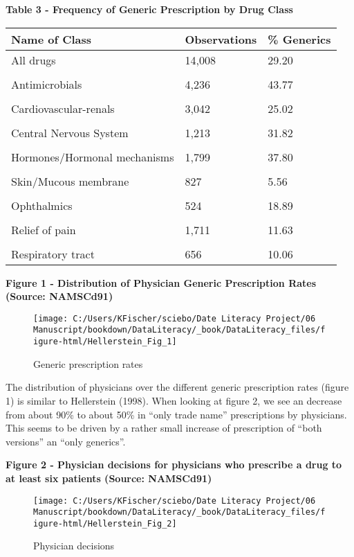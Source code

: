 \documentclass[
]{book}
\begin{document}
\textbf{Table 3 - Frequency of Generic Prescription by Drug Class}

\begin{longtable}[]{@{}lll@{}}
\toprule
Name of Class & Observations & \% Generics\tabularnewline
\midrule
\endhead
All drugs & 14,008 & 29.20\tabularnewline
& &\tabularnewline
Antimicrobials & 4,236 & 43.77\tabularnewline
& &\tabularnewline
Cardiovascular-renals & 3,042 & 25.02\tabularnewline
& &\tabularnewline
Central Nervous System & 1,213 & 31.82\tabularnewline
& &\tabularnewline
Hormones/Hormonal mechanisms & 1,799 & 37.80\tabularnewline
& &\tabularnewline
Skin/Mucous membrane & 827 & 5.56\tabularnewline
& &\tabularnewline
Ophthalmics & 524 & 18.89\tabularnewline
& &\tabularnewline
Relief of pain & 1,711 & 11.63\tabularnewline
& &\tabularnewline
Respiratory tract & 656 & 10.06\tabularnewline
\bottomrule
\end{longtable}

\textbf{Figure 1 - Distribution of Physician Generic Prescription Rates
(Source: NAMSCd91)}

\begin{figure}

{\centering \texttt{[image: C:/Users/KFischer/sciebo/Date Literacy Project/06 Manuscript/bookdown/DataLiteracy/\_book/DataLiteracy\_files/figure-html/Hellerstein\_Fig\_1]} 

}

\caption{Generic prescription rates}\label{fig:HellFig1}
\end{figure}

The distribution of physicians over the different generic prescription
rates (figure 1) is similar to Hellerstein (1998). When looking at
figure 2, we see an decrease from about 90\% to about 50\% in ``only
trade name'' prescriptions by physicians. This seems to be driven by a
rather small increase of prescription of ``both versions'' an ``only
generics''.

\textbf{Figure 2 - Physician decisions for physicians who prescribe a
drug to at least six patients (Source: NAMSCd91)}

\begin{figure}

{\centering \texttt{[image: C:/Users/KFischer/sciebo/Date Literacy Project/06 Manuscript/bookdown/DataLiteracy/\_book/DataLiteracy\_files/figure-html/Hellerstein\_Fig\_2]} 

}

\caption{Physician decisions}\label{fig:HellFig2}
\end{figure}
\end{document}
